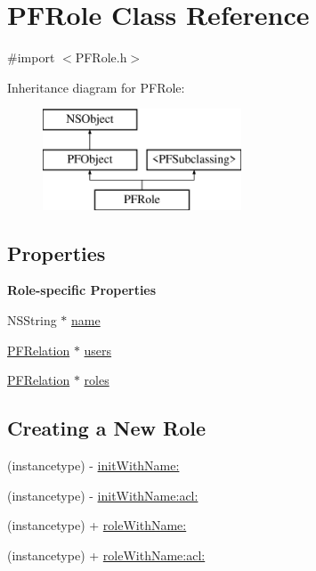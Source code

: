 \hypertarget{interface_p_f_role}{}\section{P\+F\+Role Class Reference}
\label{interface_p_f_role}


{\ttfamily \#import $<$P\+F\+Role.\+h$>$}

Inheritance diagram for P\+F\+Role\+:\begin{figure}[H]
\begin{center}
\leavevmode
\includegraphics[height=3.000000cm]{interface_p_f_role}
\end{center}
\end{figure}
\subsection*{Properties}
\begin{Indent}{\bf Role-\/specific Properties}\par
{\em 

 

 }\begin{DoxyCompactItemize}
\item 
N\+S\+String $\ast$ \hyperlink{interface_p_f_role_a35330d20271e1cbec133e236e578ef0a}{name}
\item 
\hyperlink{interface_p_f_relation}{P\+F\+Relation} $\ast$ \hyperlink{interface_p_f_role_a32309ad1b427b9d002e5487054e8ba91}{users}
\item 
\hyperlink{interface_p_f_relation}{P\+F\+Relation} $\ast$ \hyperlink{interface_p_f_role_abb4c019b60e2065df9bf16636bab7d1d}{roles}
\end{DoxyCompactItemize}
\end{Indent}
\subsection*{Creating a New Role}
\label{_amgrp58ecae998947f9174bcf466f23fe573d}%


 

 \begin{DoxyCompactItemize}
\item 
(instancetype) -\/ \hyperlink{interface_p_f_role_aa34a475774131201505c0629667a06b5}{init\+With\+Name\+:}
\item 
(instancetype) -\/ \hyperlink{interface_p_f_role_aa9ae2e54495d51779fe2da83008dc059}{init\+With\+Name\+:acl\+:}
\item 
(instancetype) + \hyperlink{interface_p_f_role_a1e1d2ca90a4ce69a41c9cbe3eadfa226}{role\+With\+Name\+:}
\item 
(instancetype) + \hyperlink{interface_p_f_role_adcd6e87b0137f86b7d4a9122f46f3b06}{role\+With\+Name\+:acl\+:}
\end{DoxyCompactItemize}
